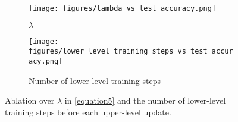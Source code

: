 \begin{figure}[!ht]
    \centering
    \begin{subfigure}[b]{0.8\linewidth}
        \centering
        \texttt{[image: figures/lambda\_vs\_test\_accuracy.png]}
        \caption{$\lambda$}
        \label{fig:ablations-lambda}
    \end{subfigure}
    \begin{subfigure}[b]{0.8\linewidth} 
        \centering
        \texttt{[image: figures/lower\_level\_training\_steps\_vs\_test\_accuracy.png]} %
        \caption{Number of lower-level training steps}
        \label{fig:ablation-steps}
    \end{subfigure}
    \caption{Ablation over $\lambda$ in \eqref{equation5} and the number of lower-level training steps before each upper-level update.}
    \label{fig:ablation}
\end{figure}

